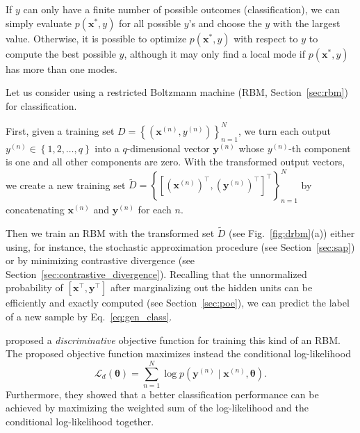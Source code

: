 \documentclass[dissertation,nocontribution,draft*]{aaltoseries}
\newcommand{\vect}[1]{\mathbf{#1}}
\newcommand{\vects}[1]{\boldsymbol{#1}}
\newcommand{\vx}[0]{\vect{x}}
\newcommand{\vy}[0]{\vect{y}}
\newcommand{\TT}[0]{{\vects{\theta}}}
\newcommand{\LL}[0]{\mathcal{L}}
\begin{document}
If $y$ can only have a finite number of possible outcomes
(classification), we can simply evaluate $p(\vx^*, y)$ for
all possible $y$'s and choose the $y$ with the largest value.
Otherwise, it is possible to optimize $p(\vx^*, y)$ with
respect to $y$ to compute the best possible $y$, although it
may only find a local mode if $p(\vx^*, y)$ has more than one
modes.

Let us consider using a restricted Boltzmann machine (RBM,
Section~\ref{sec:rbm}) for classification. 

First, given a training set $D=\left\{ \left( \vx^{(n)},
y^{(n)} \right) \right\}_{n=1}^N$, we turn each output
$y^{(n)} \in \left\{ 1, 2, \dots, q \right\}$ into a
$q$-dimensional vector $\vy^{(n)}$ whose $y^{(n)}$-th
component is one and all other components are zero. With the
transformed output vectors, we create a new training set
$\tilde{D} = \left\{ \left[(\vx^{(n)})^\top,  (\vy^{(n)})^\top
\right]^\top \right\}_{n=1}^N$ by concatenating $\vx^{(n)}$
and $\vy^{(n)}$ for each $n$.

Then we train an RBM with the transformed set $\tilde{D}$
(see Fig.~\ref{fig:drbm}(a))
either using, for instance, the stochastic approximation
procedure (see Section~\ref{sec:sap}) or by minimizing
contrastive divergence (see
Section~\ref{sec:contrastive_divergence}). Recalling that
the unnormalized probability of $\left[ \vx^\top, \vy^\top
\right]$ after marginalizing out the hidden units can be
efficiently and exactly computed (see
Section~\ref{sec:poe}), we can predict the label of a new
sample by Eq.~\eqref{eq:gen_class}.

\citet{Larochelle2008} proposed a \textit{discriminative}
objective function for training this kind of an RBM. The proposed
objective function maximizes instead 
the conditional log-likelihood 
\[
\LL_d(\TT) = \sum_{n=1}^N \log p(\vy^{(n)} \mid \vx^{(n)},
\TT).
\]
Furthermore, they showed that a better classification
performance can be achieved by maximizing the weighted sum
of the log-likelihood and the conditional log-likelihood
together.
\end{document}
